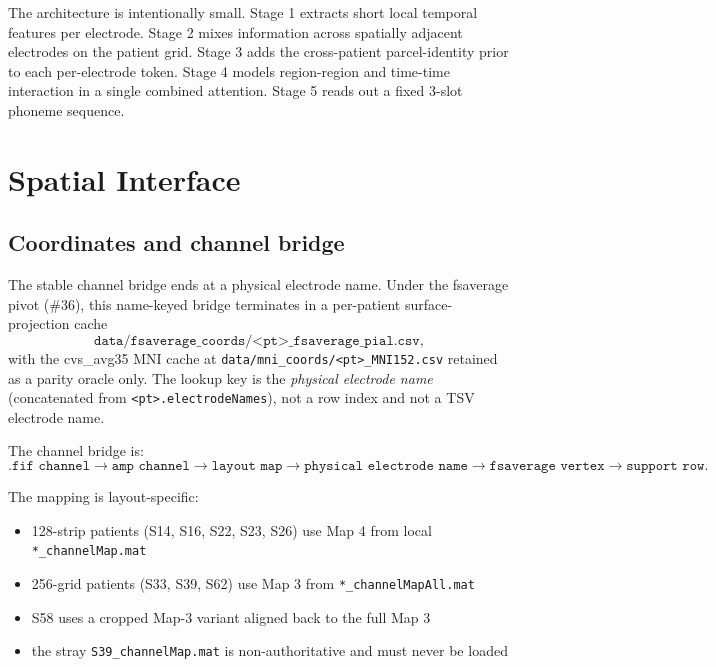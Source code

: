 \documentclass[11pt,letterpaper]{article}
\begin{document}
The architecture is intentionally small. Stage 1 extracts short local temporal features per electrode. Stage 2 mixes information across spatially adjacent electrodes on the patient grid. Stage 3 adds the cross-patient parcel-identity prior to each per-electrode token. Stage 4 models region-region and time-time interaction in a single combined attention. Stage 5 reads out a fixed 3-slot phoneme sequence.


\section{Spatial Interface}

\subsection{Coordinates and channel bridge}

The stable channel bridge ends at a physical electrode name. Under the fsaverage pivot (\#36), this name-keyed bridge terminates in a per-patient surface-projection cache
\begin{equation}
\texttt{data/fsaverage\_coords/<pt>\_fsaverage\_pial.csv},
\end{equation}
with the cvs\_avg35 MNI cache at \texttt{data/mni\_coords/<pt>\_MNI152.csv} retained as a parity oracle only. The lookup key is the \emph{physical electrode name} (concatenated from \texttt{<pt>.electrodeNames}), not a row index and not a TSV electrode name.

The channel bridge is:
\begin{equation}
\texttt{.fif channel} \rightarrow \texttt{amp channel} \rightarrow \texttt{layout map}
\rightarrow \texttt{physical electrode name} \rightarrow \texttt{fsaverage vertex} \rightarrow \texttt{support row}.
\end{equation}

The mapping is layout-specific:
\begin{itemize}[leftmargin=2em, itemsep=0.2em]
\item 128-strip patients (S14, S16, S22, S23, S26) use Map 4 from local \texttt{*\_channelMap.mat}
\item 256-grid patients (S33, S39, S62) use Map 3 from \texttt{*\_channelMapAll.mat}
\item S58 uses a cropped Map-3 variant aligned back to the full Map 3
\item the stray \texttt{S39\_channelMap.mat} is non-authoritative and must never be loaded
\end{itemize}
\end{document}
